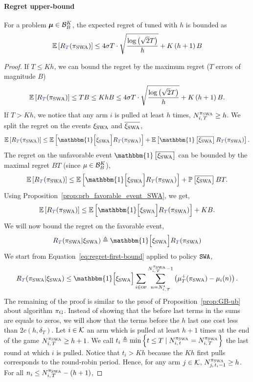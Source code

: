 \paragraph{Regret upper-bound}
%
\begin{proposition}
\label{prop:SWA}
 For a problem ${\boldsymbol \mu} \in \mathcal{B}_{B}^K$, the expected regret of \SWA tuned with $h$ is bounded as
 \[
\EE{\regret(\piSWA)} \leq 4\sigma T\cdot\sqrt{\frac{\log\pa{\sqrt{2}T}}{h}} + K\pa{h+1}B
 \]
\end{proposition}
%
\begin{proof}
If $T \leq Kh$, we can bound the regret by the maximum regret ($T$ errors of magnitude $B$)
\[
\EE{\regret(\piSWA)} \leq TB \leq KhB \leq 4\sigma T\cdot\sqrt{\frac{\log\pa{\sqrt{2}T}}{h}} + K\pa{h+1}B.
\]
%
If $T > Kh$, we notice that any arm $i$ is pulled at least $h$ times, \ie $N_{i,\,T}^{\pi_{\rm SWA}} \geq h$. We split the regret on the events $\xi_{\rm SWA}$ and $\overline{\xi_{\rm SWA}}$, 
\[
\EE{\regret(\piSWA)} \leq \EE{\mathbbm{1} \Big[\HPSWA\Big] \regret(\piSWA)} + \EE{\mathbbm{1} \left[\bar{\HPSWA}\right] \regret(\piSWA)}.
\]
%
The regret on the unfavorable event $\mathbbm{1} \left[\bar{\HPSWA}\right]$ can be bounded by the maximal regret $BT$ (since $\mu \in \mathcal{B}_{B}^K$), 
\[
\EE{\regret(\piSWA)} \leq  \EE{\mathbbm{1} \Big[\HPSWA\Big] \regret(\piSWA)} + \PP{\bar{\HPSWA}} BT.
\]
%
Using Proposition~\ref{prop:prb_favorable_event_SWA}, we get,
\begin{equation}
\label{eq:regret-unfav-event-SWA}
\EE{\regret(\piSWA)} \leq  \EE{\mathbbm{1} \Big[\HPSWA\Big]  \regret(\piSWA)} + KB.
\end{equation}
%
We will now bound the regret on the favorable event,
\[
\regret(\piSWA | \HPSWA) \triangleq \mathbbm{1} \Big[\HPSWA\Big]  \regret(\piSWA)
\]
%
We start from Equation~\ref{eq:regret-first-bound} applied to policy $\normalfont \texttt{SWA}$,
\begin{equation}
\label{eq:regret-first-bound-SWA}
\regret(\piSWA| \HPSWA) \leq  \mathbbm{1} \Big[\HPSWA\Big] \sum_{i\in \overpullSet}    \sum_{n=\NiT^\star}^{\NiT^{\piSWA}-1} \pa{\mu^+_T(\piSWA) - \mu_i(n)}.
\end{equation}
%
The remaining of the proof is similar to the proof of Proposition~\ref{prop:GB-ub} about algorithm $\pi_{\rm G}$. Instead of showing that the before last terms in the sums are equals to zeros, we will show that the terms before the $h$ last one cost less than $2c(h, \delta_T)$. Let $i \in \mathcal{K}$ an arm which is pulled at least $h+1$ times at the end of the game $N_{i,\,T}^{\pi_{\rm SWA}} \geq h+1$. We call $t_i \triangleq \min\left\{t\leq T\; |\; N_{i,\,t}^{\pi_{\rm SWA}} = N_{i,\,T}^{\pi_{\rm SWA}}\right\}$ the last round at which $i$ is pulled. Notice that $t_i > Kh$ because the $Kh$ first pulls corresponds to the round-robin period. Hence, for any arm $j \in \mathcal{K}$, $N_{j,\,t_i -1}^{\pi_{\rm SWA}} \geq h$. For all $n_i \leq N_{i,\,T}^{\pi_{\rm SWA}} -(h+1)$, 

\end{proof}
